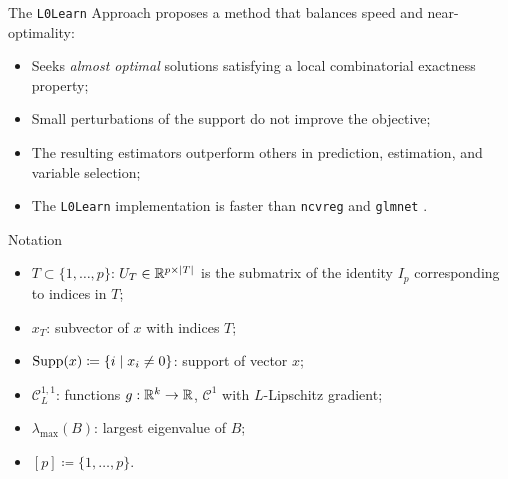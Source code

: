 \begin{frame}{The \texttt{L0Learn} Approach}
\cite{fastselect} proposes a method that balances speed and near-optimality: 
\begin{itemize}
\item Seeks \textit{almost optimal} solutions satisfying a local combinatorial exactness property;
\item Small perturbations of the support do not improve the objective;
\item The resulting estimators outperform others in prediction, estimation, and variable selection;
\item The \texttt{L0Learn} implementation is faster than \texttt{ncvreg} \cite{ncvreg} and \texttt{glmnet} \cite{glmnet}.
\end{itemize}
\end{frame}

\begin{frame}{Notation}
\begin{itemize}
\item $T \subset \{1,\dots,p\}$: $U_T \in \mathbb{R}^{p \times |T|}$ is the submatrix of the identity $I_p$ corresponding to indices in $T$;
\item $x_T$: subvector of $x$ with indices $T$;
\item $\operatorname{Supp}(x) \coloneqq \{i \mid x_i \neq 0\}$: support of vector $x$;
\item $\mathcal{C}^{1,1}_L$: functions $g:\mathbb{R}^k \to \mathbb{R}$, $\mathcal{C}^1$ with $L$-Lipschitz gradient;
\item $\lambda_{\max}(B)$: largest eigenvalue of $B$;
\item $[p] \coloneqq \{1,\dots,p\}$.
\end{itemize}
\end{frame}